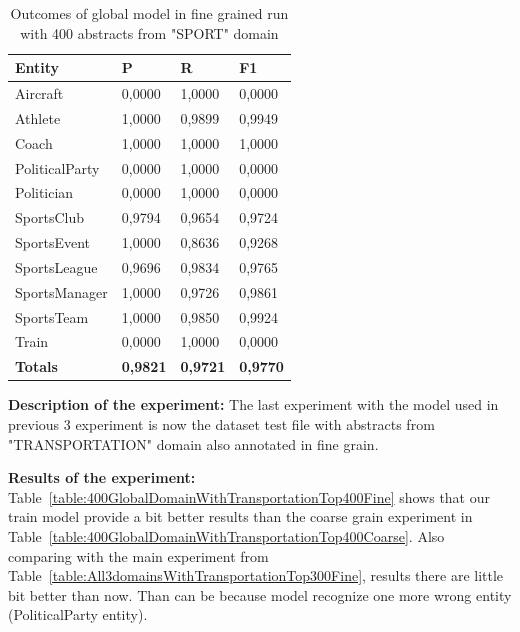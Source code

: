 \documentclass[thesis=M,english]{FITthesis}[2018/05/30]
\begin{document}
	\begin{table}[H]\centering
		\begin{tabular}{|l|l|l|l|}
			\hline {\textbf{Entity}} & {\textbf{P}} & {\textbf{R}} & {\textbf{F1}}\\\hline
				Aircraft & 0,0000 & 1,0000 & 0,0000\\
				Athlete & 1,0000 & 0,9899 & 0,9949\\
				Coach & 1,0000 & 1,0000 & 1,0000\\
				PoliticalParty & 0,0000 & 1,0000 & 0,0000\\
				Politician & 0,0000 & 1,0000 & 0,0000\\
				SportsClub & 0,9794 & 0,9654 & 0,9724\\
				SportsEvent & 1,0000 & 0,8636 & 0,9268\\
				SportsLeague & 0,9696 & 0,9834 & 0,9765\\
				SportsManager & 1,0000 & 0,9726 & 0,9861\\				
				SportsTeam & 1,0000 & 0,9850 & 0,9924\\
				Train & 0,0000 & 1,0000 & 0,0000\\\hline
				\textbf{Totals} & \textbf{0,9821} & \textbf{0,9721} & \textbf{0,9770}\\\hline
		\end{tabular}
		\caption{Outcomes of global model in fine grained run with 400 abstracts from "SPORT" domain \label{table:400GlobalDomainWithSportsTop400Fine}}
	\end{table}	


\textbf{Description of the experiment:} The last experiment with the model used in previous 3 experiment is now the dataset test file with abstracts from "TRANSPORTATION" domain also annotated in fine grain.

\textbf{Results of the experiment:} Table~\ref{table:400GlobalDomainWithTransportationTop400Fine} shows that our train model provide a bit better results than the coarse grain experiment in Table~\ref{table:400GlobalDomainWithTransportationTop400Coarse}. Also comparing with the main experiment from Table~\ref{table:All3domainsWithTransportationTop300Fine}, results there are little bit better than now. Than can be because model recognize one more wrong entity (PoliticalParty entity).
\end{document}
